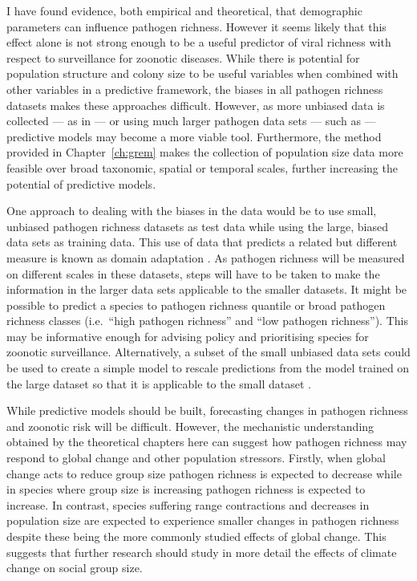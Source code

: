 I have found evidence, both empirical and theoretical, that demographic parameters can influence pathogen richness.
However it seems likely that this effect alone is not strong enough to be a useful predictor of viral richness with respect to surveillance for zoonotic diseases.
While there is potential for population structure and colony size to be useful variables when combined with other variables in a predictive framework, the biases in all pathogen richness datasets makes these approaches difficult.
However, as more unbiased data is collected --- as in \textcite{anthony2013strategy, anthony2015non} --- or using much larger pathogen data sets --- such as \textcite{wardeh2015database} --- predictive models may become a more viable tool.
Furthermore, the method provided in Chapter~\ref{ch:grem} makes the collection of population size data more feasible over broad taxonomic, spatial or temporal scales, further increasing the potential of predictive models.

One approach to dealing with the biases in the data would be to use small, unbiased pathogen richness datasets as test data while using the large, biased data sets as training data.
This use of data that predicts a related but different measure is known as domain adaptation \cite{daume2006domain, daume2009frustratingly}.
As pathogen richness will be measured on different scales in these datasets, steps will have to be taken to make the information in the larger data sets applicable to the smaller datasets.
It might be possible to predict a species to pathogen richness quantile or broad pathogen richness classes (i.e.\ ``high pathogen richness'' and ``low pathogen richness'').
This may be informative enough for advising policy and prioritising species for zoonotic surveillance.
Alternatively, a subset of the small unbiased data sets could be used to create a simple model to rescale predictions from the model trained on the large dataset so that it is applicable to the small dataset \cite{daume2009frustratingly}.

While predictive models should be built, forecasting changes in pathogen richness and zoonotic risk will be difficult.
However, the mechanistic understanding obtained by the theoretical chapters here can suggest how pathogen richness may respond to global change and other population stressors.
Firstly, when global change acts to reduce group size \cite{lehmann2010apes, zunino2007habitat, manor2003impact, atwood2006influence} pathogen richness is expected to decrease while in species where group size is increasing \cite{lehmann2010apes} pathogen richness is expected to increase.
In contrast, species suffering range contractions \cite{thomas2004extinction} and decreases in population size \cite{craigie2010large} are expected to experience smaller changes in pathogen richness despite these being the more commonly studied effects of global change.
This suggests that further research should study in more detail the effects of climate change on social group size.

